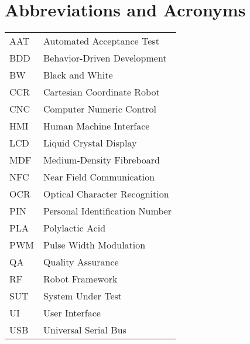 
\chapter*{Abbreviations and Acronyms}


\noindent
\begin{longtable}{@{}p{}p{}@{}}

AAT & Automated Acceptance Test \\
BDD & Behavior-Driven Development \\
BW & Black and White \\
CCR & Cartesian Coordinate Robot \\
CNC & Computer Numeric Control \\
HMI & Human Machine Interface \\
LCD & Liquid Crystal Display \\
MDF & Medium-Density Fibreboard \\
NFC & Near Field Communication \\
OCR & Optical Character Recognition \\
PIN & Personal Identification Number \\
PLA & Polylactic Acid \\
PWM & Pulse Width Modulation \\
QA & Quality Assurance \\
RF & Robot Framework \\
SUT & System Under Test \\
UI & User Interface \\
USB & Universal Serial Bus \\

\end{longtable}
